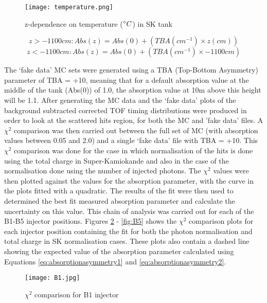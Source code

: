 \documentclass[11pt,oneside,a4paper]{article}
\begin{document}
\begin{figure}[htbp]
	\centering
	\texttt{[image: temperature.png]}
	\caption{z-dependence on temperature ($\degree C$) in SK tank}
	\label{fig:temperature}
\end{figure}


\begin{equation}
\label{eq:absorptionasymmetry1}
z>-1100cm: Abs(z) = Abs(0) + (TBA(cm^{-1}) \times z(cm))
\end{equation}	
\begin{equation}
\label{eq:absorptionasymmetry2}
z< -1100cm: Abs(z) = Abs(0) + (TBA(cm^{-1}) \times -1100cm)
\end{equation}

The `fake data' MC sets were generated using a TBA (Top-Bottom Asymmetry) parameter of TBA = +10, meaning that for a default absorption value at the middle of the tank (Abs(0)) of 1.0, the absorption value at 10m above this height will be 1.1. After generating the MC data and the `fake data' plots of the background subtracted corrected TOF timing distributions were produced in order to look at the scattered hits region, for both the MC and 'fake data' files. A $\chi^{2}$ comparison was then carried out between the full set of MC (with absorption values between 0.05 and 2.0) and a single `fake data' file with TBA = +10. This $\chi^{2}$ comparison was done for the case in which normalisation of the hits is done using the total charge in Super-Kamiokande and also in the case of the normalisation done using the number of injected photons. The $\chi^{2}$ values were then plotted against the values for the absorption parameter, with the curve in the plots fitted with a quadratic. The results of the fit were then used to determined the best fit measured absorption parameter and calculate the uncertainty on this value. This chain of analysis was carried out for each of the B1-B5 injector positions. Figures \ref{fig:B1} - \ref{fig:B5} shows the $\chi^{2}$ comparison plots for each injector position containing the fit for both the photon normalisation and total charge in SK normalisation cases. These plots also contain a dashed line showing the expected value of the absorption parameter calculated using Equations \ref{eq:absorptionasymmetry1} and \ref{eq:absorptionasymmetry2}.  


\begin{figure}[htbp]
	\centering
	\texttt{[image: B1.jpg]}
	\caption{$\chi^{2}$ comparison for B1 injector}
	\label{fig:B1}
\end{figure}
\end{document}
